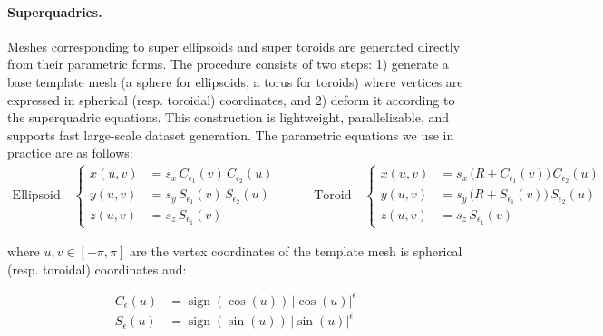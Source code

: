 \paragraph{Superquadrics.} Meshes corresponding to super ellipsoids and super toroids are generated directly from their parametric forms. The procedure consists of two steps: 1) generate a base template mesh (a sphere for ellipsoids, a torus for toroids) where vertices are expressed in spherical (resp. toroidal) coordinates, and 2) deform it according to the superquadric equations. This construction is lightweight, parallelizable, and supports fast large-scale dataset generation. The parametric equations we use in practice are as follows:
\begin{equation}
\begin{aligned}
\text{Ellipsoid} \quad
\begin{cases}
x(u,v) &= s_x \, C_{\epsilon_1}(v) \, C_{\epsilon_2}(u) \\
y(u,v) &= s_y \, S_{\epsilon_1}(v) \, S_{\epsilon_2}(u) \\
z(u,v) &= s_z \, S_{\epsilon_1}(v)
\end{cases}
\end{aligned}
\qquad
\begin{aligned}
\text{Toroid} \quad
\begin{cases}
x(u,v) &= s_x \, \bigl(R + C_{\epsilon_1}(v)\bigr) \, C_{\epsilon_2}(u) \\
y(u,v) &= s_y \, \bigl(R + S_{\epsilon_1}(v)\bigr) \, S_{\epsilon_2}(u) \\
z(u,v) &= s_z \, S_{\epsilon_1}(v)
\end{cases}
\end{aligned}
\end{equation}


where $u,v \in [-\pi, \pi]$ are the vertex coordinates of the template mesh is spherical (resp. toroidal) coordinates and:

\begin{equation}
\begin{aligned}
C_\epsilon(u) &= \operatorname{sign}(\cos(u)) \, |\cos(u)|^\epsilon \\
S_\epsilon(u) &= \operatorname{sign}(\sin(u)) \, |\sin(u)|^\epsilon
\end{aligned}
\end{equation}


